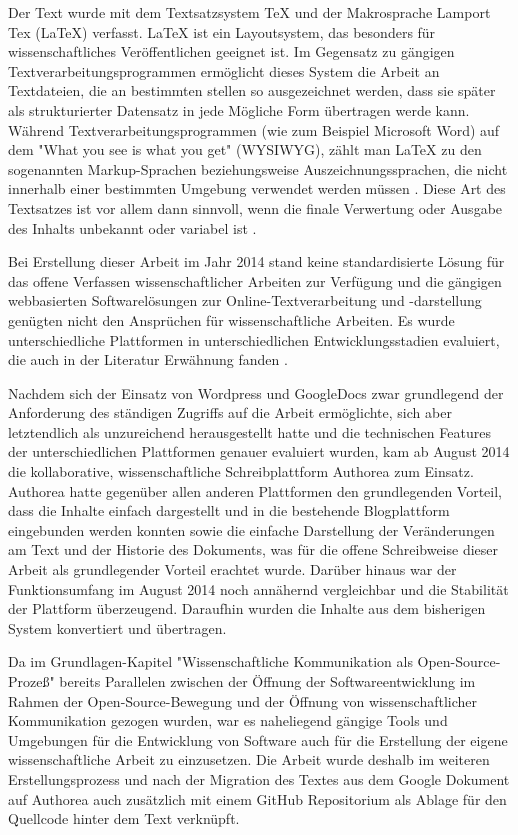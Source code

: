 Der Text wurde mit dem Textsatzsystem TeX und der Makrosprache Lamport Tex (LaTeX) verfasst. LaTeX ist ein Layoutsystem, das besonders für wissenschaftliches Veröffentlichen geeignet ist. Im Gegensatz zu gängigen Textverarbeitungsprogrammen ermöglicht dieses System die Arbeit an Textdateien, die an bestimmten stellen so ausgezeichnet werden, dass sie später als strukturierter Datensatz in jede Mögliche Form übertragen werde kann. Während Textverarbeitungsprogrammen (wie zum Beispiel Microsoft Word) auf dem "What you see is what you get" (WYSIWYG), zählt man LaTeX zu den sogenannten Markup-­Sprachen beziehungsweise Auszeichnungssprachen, die nicht innerhalb einer bestimmten Umgebung verwendet werden müssen \cite{Sievers_2012}. Diese Art des Textsatzes ist vor allem dann sinnvoll, wenn die finale Verwertung oder Ausgabe des Inhalts unbekannt oder variabel ist  \cite{braune_2007_latex}.

Bei Erstellung dieser Arbeit im Jahr 2014 stand keine standardisierte Lösung für das offene Verfassen wissenschaftlicher Arbeiten zur Verfügung und die gängigen webbasierten Softwarelösungen zur Online-Textverarbeitung und -darstellung genügten nicht den Ansprüchen für wissenschaftliche Arbeiten. Es wurde unterschiedliche Plattformen in unterschiedlichen Entwicklungsstadien evaluiert, die auch in der Literatur Erwähnung fanden \cite{Perkel_2014}.

Nachdem sich der Einsatz von Wordpress und GoogleDocs zwar grundlegend der Anforderung des ständigen Zugriffs auf die Arbeit ermöglichte, sich aber letztendlich als unzureichend herausgestellt hatte und die technischen Features der unterschiedlichen Plattformen genauer evaluiert wurden, kam ab August 2014 die kollaborative, wissenschaftliche Schreibplattform Authorea zum Einsatz. Authorea hatte gegenüber allen anderen Plattformen den grundlegenden Vorteil, dass die Inhalte einfach dargestellt und in die bestehende Blogplattform eingebunden werden konnten sowie die einfache Darstellung der Veränderungen am Text und der Historie des Dokuments, was für die offene Schreibweise dieser Arbeit als grundlegender Vorteil erachtet wurde. Darüber hinaus war der Funktionsumfang im August 2014 noch annähernd vergleichbar und die Stabilität der Plattform überzeugend. Daraufhin wurden die Inhalte aus dem bisherigen System konvertiert und übertragen.

Da im Grundlagen-Kapitel "Wissenschaftliche Kommunikation als Open-Source-Prozeß" bereits Parallelen zwischen der Öffnung der Softwareentwicklung im Rahmen der Open-Source-Bewegung und der Öffnung von wissenschaftlicher Kommunikation gezogen wurden, war es naheliegend gängige Tools und Umgebungen für die Entwicklung von Software auch für die Erstellung der eigene wissenschaftliche Arbeit zu einzusetzen. Die Arbeit wurde deshalb im weiteren Erstellungsprozess und nach der Migration des Textes aus dem Google Dokument auf Authorea auch zusätzlich mit einem GitHub Repositorium als Ablage für den Quellcode hinter dem Text verknüpft.

